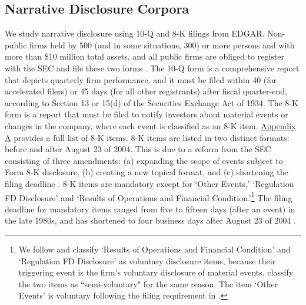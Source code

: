 \documentclass[letterpaper,12pt]{article}
\begin{document}
\begin{spacing}{1.5}
\subsection{Narrative Disclosure Corpora} \label{sec3.2}
\noindent We study narrative disclosure using 10-Q and 8-K filings from EDGAR. Non-public firms held by 500 (and in some situations, 300) or more persons and with more than \$10 million total assets, and all public firms are obliged to register with the SEC and file these two forms \cite{segalAreManagersStrategic2016}. The 10-Q form is a comprehensive report that depicts quarterly firm performance, and it must be filed within 40 (for accelerated filers) or 45 days (for all other registrants) after fiscal quarter-end, according to Section 13 or 15(d) of the Securities Exchange Act of 1934. The 8-K form is a report that must be filed to notify investors about material events or changes in the company, where each event is classified as an 8-K item. \hyperref[appa]{Appendix A} provides a full list of 8-K items. 8-K items are listed in two distinct formats: before and after August 23 of 2004. This is due to a reform from the SEC consisting of three amendments: (a) expanding the scope of events subject to Form 8-K disclosure, (b) creating a new topical format, and (c) shortening the filing deadline \cite{secFinalRuleAdditional2004, lermanNewForm8K2010}. 8-K items are mandatory except for `Other Events,'  `Regulation FD Disclosure' and `Results of Operations and Financial Condition.'\footnote{We follow  and classify `Results of Operations and Financial Condition' and `Regulation FD Disclosure' as voluntary disclosure items, because their triggering event is the firm's voluntary disclosure of material events.  classify the two items as ``semi-voluntary" for the same reason. The item `Other Events' is voluntary following the filing requirement in . } The filing deadline for mandatory items ranged from five to fifteen days (after an event) in the late 1980s, and has shortened to four business days after August 23 of 2004 \cite{lermanNewForm8K2010}.


\end{spacing}
\end{document}
